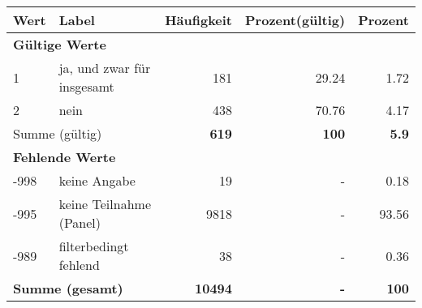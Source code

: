      \begin{longtable}{lXrrr}
     \toprule
     \textbf{Wert} & \textbf{Label} & \textbf{Häufigkeit} & \textbf{Prozent(gültig)} & \textbf{Prozent} \\
     \endhead
     \midrule
     \multicolumn{5}{l}{\textbf{Gültige Werte}}\\

     1 &
     \multicolumn{1}{X}{ ja, und zwar für insgesamt   } &


       \num{181} &
       \num[round-mode=places,round-precision=2]{29.24} &
         \num[round-mode=places,round-precision=2]{1.72} \\

     2 &
     \multicolumn{1}{X}{ nein   } &


       \num{438} &
       \num[round-mode=places,round-precision=2]{70.76} &
         \num[round-mode=places,round-precision=2]{4.17} \\
     \midrule
     \multicolumn{2}{l}{Summe (gültig)} &
       \textbf{\num{619}} &
     \textbf{\num{100}} &
       \textbf{\num[round-mode=places,round-precision=2]{5.9}} \\
     \multicolumn{5}{l}{\textbf{Fehlende Werte}}\\
       -998 &
       keine Angabe &
         \num{19} &
        - &
         \num[round-mode=places,round-precision=2]{0.18} \\
       -995 &
       keine Teilnahme (Panel) &
         \num{9818} &
        - &
         \num[round-mode=places,round-precision=2]{93.56} \\
       -989 &
       filterbedingt fehlend &
         \num{38} &
        - &
         \num[round-mode=places,round-precision=2]{0.36} \\
     \midrule
     \multicolumn{2}{l}{\textbf{Summe (gesamt)}} &
          \textbf{\num{10494}} &
        \textbf{-} &
        \textbf{\num{100}} \\
     \bottomrule
     \end{longtable}
     
